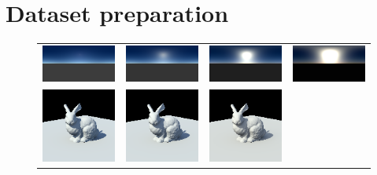 \section{Dataset preparation}
\label{sec:dataset}

\begin{figure}
\centering
\footnotesize
\setlength{\tabcolsep}{1pt}
\begin{tabular}{cccc} 
\includegraphics[width=.24\linewidth]{figures/hwmodel/t_1_envmap.png} &
\includegraphics[width=.24\linewidth]{figures/hwmodel/t_3_envmap.png} &
\includegraphics[width=.24\linewidth]{figures/hwmodel/t_7_envmap.png} &
\includegraphics[width=.24\linewidth]{figures/hwmodel/t_10_envmap.png} \\
\includegraphics[width=.24\linewidth]{figures/hwmodel/t_1.png} &
\includegraphics[width=.24\linewidth]{figures/hwmodel/t_3.png} &
\includegraphics[width=.24\linewidth]{figures/hwmodel/t_7.png} &

\end{tabular}
\end{figure}
